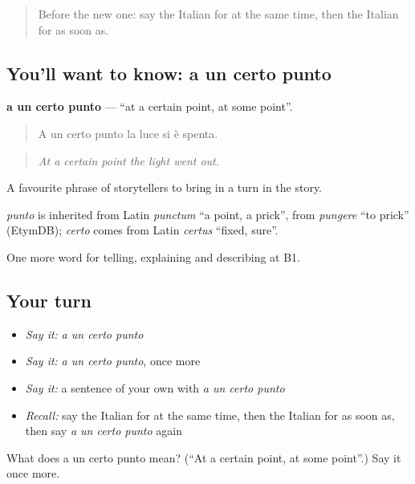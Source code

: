 \begin{quote}
Before the new one: say the Italian for at the same time, then the Italian for as soon as.
\end{quote}

\subsection*{You'll want to know: a un certo punto}
\textbf{a un certo punto} — \textquotedblleft{}at a certain point, at some point\textquotedblright{}.

\begin{quote}
A un certo punto la luce si è spenta.
\end{quote}

\begin{quote}
\emph{At a certain point the light went out.}
\end{quote}

A favourite phrase of storytellers to bring in a turn in the story.

\begin{cousinweb}
\emph{punto} is inherited from Latin \emph{punctum} \textquotedblleft{}a point, a prick\textquotedblright{}, from \emph{pungere} \textquotedblleft{}to prick\textquotedblright{} (EtymDB); \emph{certo} comes from Latin \emph{certus} \textquotedblleft{}fixed, sure\textquotedblright{}.
\end{cousinweb}

\begin{grammarlens}[title={What you've built}]
One more word for telling, explaining and describing at B1.
\end{grammarlens}

\subsection*{Your turn}
\begin{itemize}
\raggedright
  \item \emph{Say it:} \emph{a un certo punto}
  \item \emph{Say it:} \emph{a un certo punto}, once more
  \item \emph{Say it:} a sentence of your own with \emph{a un certo punto}
  \item \emph{Recall:} say the Italian for at the same time, then the Italian for as soon as, then say \emph{a un certo punto} again
\end{itemize}

\begin{tcolorbox}[breakable,colback=teal!4,colframe=teal!35!black,title={Before you move on}]
What does a un certo punto mean? (\textquotedblleft{}At a certain point, at some point\textquotedblright{}.) Say it once more.
\end{tcolorbox}

